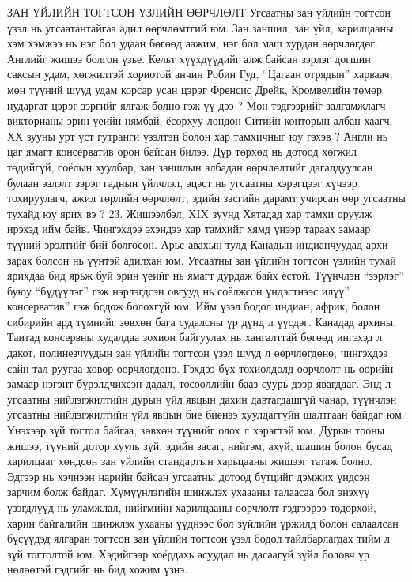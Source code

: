 ЗАН ҮЙЛИЙН ТОГТСОН ҮЗЛИЙН ӨӨРЧЛӨЛТ
Угсаатны зан үйлийн тогтсон үзэл нь угсаатантайгаа адил өөрчлөмтгий юм. Зан заншил, зан үйл, харилцааны хэм хэмжээ нь нэг бол удаан бөгөөд аажим, нэг бол маш хурдан өөрчлөгдөг. Английг жишээ болгон үзье. Кельт хүүхдүүдийг алж байсан зэрлэг догшин саксын удам, хөгжилтэй хориотой анчин Робин Гуд, “Цагаан отрядын” харваач, мөн түүний шууд удам корсар усан цэрэг Френсис Дрейк, Кромвелийн төмөр нударгат цэрэг зэргийг ялгаж болно гэж үү дээ ? Мөн тэдгээрийг залгамжлагч викторианы эрин үеийн нямбай, ёсорхуу лондон Ситийн конторын албан хаагч, ХХ зууны урт үст гутранги үзэлтэн болон хар тамхичныг юу гэхэв ? Англи нь цаг ямагт консерватив орон байсан билээ. Дүр төрхөд нь дотоод хөгжил төдийгүй, соёлын хуулбар, зан заншлын албадан өөрчлөлтийг дагалдуулсан булаан эзлэлт зэрэг гаднын үйлчлэл, эцэст нь угсаатны хэрэгцээг хүчээр тохируулагч, ажил төрлийн өөрчлөлт, эдийн засгийн дарамт учирсан өөр угсаатны тухайд юу ярих вэ ? 23. Жишээлбэл, XIX зуунд Хятадад хар тамхи оруулж ирэхэд ийм байв. Чингэхдээ эхэндээ хар тамхийг хямд үнээр тараах замаар түүний эрэлтийг бий болгосон. Арьс авахын тулд Канадын индианчуудад архи зарах болсон нь үүнтэй адилхан юм.
Угсаатны зан үйлийн тогтсон үзлийн тухай ярихдаа бид ярьж буй эрин үеийг нь ямагт дурдаж байх ёстой. Түүнчлэн “зэрлэг” буюу “бүдүүлэг” гэж нэрлэгдсэн овгууд нь соёлжсон үндэстнээс илүү” консерватив” гэж бодож болохгүй юм. Ийм үзэл бодол индиан, африк, болон сибирийн ард түмнийг зөвхөн бага судалсны үр дүнд л үүсдэг. Канадад архины, Таитад консервны худалдаа зохион байгуулах нь хангалттай бөгөөд ингэхэд л дакот, полинезчуудын зан үйлийн тогтсон үзэл шууд л өөрчлөгдөнө, чингэхдээ сайн тал руугаа ховор өөрчлөгдөнө. Гэхдээ бүх тохиолдолд өөрчлөлт нь өөрийн замаар нэгэнт бүрэлдчихсэн дадал, төсөөллийн бааз суурь дээр явагддаг. Энд л угсаатны нийлэгжилтийн дурын үйл явцын дахин давтагдашгүй чанар, түүнчлэн угсаатны нийлэгжилтийн үйл явцын бие биенээ хуулдаггүйн шалтгаан байдаг юм. Үнэхээр зүй тогтол байгаа, зөвхөн түүнийг олох л хэрэгтэй юм.
Дурын тооны жишээ, түүний дотор хууль зүй, эдийн засаг, нийгэм, ахуй, шашин болон бусад харилцааг хөндсөн зан үйлийн стандартын харьцааны жишээг татаж болно. Эдгээр нь хэчнээн нарийн байсан угсаатны дотоод бүтцийг дэмжих үндсэн зарчим болж байдаг. Хүмүүнлэгийн шинжлэх ухаааны талаасаа бол энэхүү үзэгдлүүд нь уламжлал, нийгмийн харилцааны өөрчлөлт гэдгээрээ тодорхой, харин байгалийн шинжлэх ухааны үүднээс бол зүйлийн үржилд болон салаалсан бүсүүдэд ялгаран тогтсон зан үйлийн тогтсон үзэл бодол тайлбарлагдах тийм л зүй тогтолтой юм. Хэдийгээр хоёрдахь асуудал нь дасаагүй зүйл боловч үр нөлөөтэй гэдгийг нь бид хожим үзнэ.

